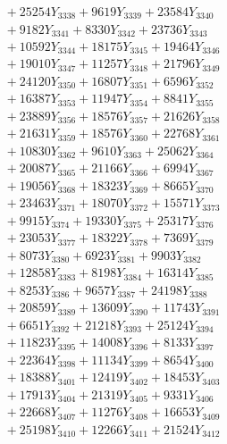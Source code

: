 \documentclass[a4paper,10pt]{article}
\begin{document}
{\begin{align}
&\;  + 25254 Y_{3338} + 9619 Y_{3339} + 23584 Y_{3340} \\[0.3ex]
&\;  + 9182 Y_{3341} + 8330 Y_{3342} + 23736 Y_{3343} \\[0.3ex]
&\;  + 10592 Y_{3344} + 18175 Y_{3345} + 19464 Y_{3346} \\[0.3ex]
&\;  + 19010 Y_{3347} + 11257 Y_{3348} + 21796 Y_{3349} \\[0.3ex]
&\;  + 24120 Y_{3350} + 16807 Y_{3351} + 6596 Y_{3352} \\[0.3ex]
&\;  + 16387 Y_{3353} + 11947 Y_{3354} + 8841 Y_{3355} \\[0.3ex]
&\;  + 23889 Y_{3356} + 18576 Y_{3357} + 21626 Y_{3358} \\[0.5ex]\allowbreak
&\;  + 21631 Y_{3359} + 18576 Y_{3360} + 22768 Y_{3361} \\[0.3ex]
&\;  + 10830 Y_{3362} + 9610 Y_{3363} + 25062 Y_{3364} \\[0.3ex]
&\;  + 20087 Y_{3365} + 21166 Y_{3366} + 6994 Y_{3367} \\[0.3ex]
&\;  + 19056 Y_{3368} + 18323 Y_{3369} + 8665 Y_{3370} \\[0.3ex]
&\;  + 23463 Y_{3371} + 18070 Y_{3372} + 15571 Y_{3373} \\[0.3ex]
&\;  + 9915 Y_{3374} + 19330 Y_{3375} + 25317 Y_{3376} \\[0.3ex]
&\;  + 23053 Y_{3377} + 18322 Y_{3378} + 7369 Y_{3379} \\[0.3ex]
&\;  + 8073 Y_{3380} + 6923 Y_{3381} + 9903 Y_{3382} \\[0.3ex]
&\;  + 12858 Y_{3383} + 8198 Y_{3384} + 16314 Y_{3385} \\[0.3ex]
&\;  + 8253 Y_{3386} + 9657 Y_{3387} + 24198 Y_{3388} \\[0.5ex]\allowbreak
&\;  + 20859 Y_{3389} + 13609 Y_{3390} + 11743 Y_{3391} \\[0.3ex]
&\;  + 6651 Y_{3392} + 21218 Y_{3393} + 25124 Y_{3394} \\[0.3ex]
&\;  + 11823 Y_{3395} + 14008 Y_{3396} + 8133 Y_{3397} \\[0.3ex]
&\;  + 22364 Y_{3398} + 11134 Y_{3399} + 8654 Y_{3400} \\[0.3ex]
&\;  + 18388 Y_{3401} + 12419 Y_{3402} + 18453 Y_{3403} \\[0.3ex]
&\;  + 17913 Y_{3404} + 21319 Y_{3405} + 9331 Y_{3406} \\[0.3ex]
&\;  + 22668 Y_{3407} + 11276 Y_{3408} + 16653 Y_{3409} \\[0.3ex]
&\;  + 25198 Y_{3410} + 12266 Y_{3411} + 21524 Y_{3412} \\[0.3ex]

\end{align}}
\end{document}
